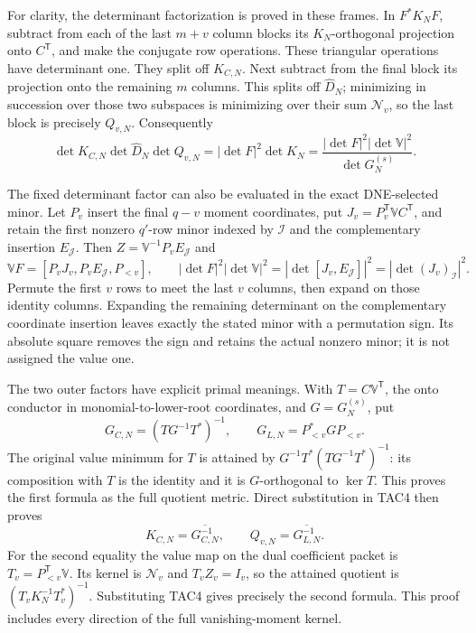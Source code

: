 \documentclass[11pt,a4paper]{article}
\begin{document}
For clarity, the determinant factorization is proved in these frames.
In $F^*K_NF$, subtract from each of the last $m+v$ column blocks
its $K_N$-orthogonal projection onto $C^{\mathsf T}$, and make the
conjugate row operations.  These triangular operations have determinant
one.  They split off $K_{C,N}$.  Next subtract from the final block
its projection onto the remaining $m$ columns.  This splits off
$\widehat D_N$; minimizing in succession over those two subspaces is
minimizing over their sum $\mathscr N_v$, so the last block is precisely
$Q_{v,N}$.  Consequently
\[
 \det K_{C,N}\det\widehat D_N\det Q_{v,N}
 =|\det F|^2\det K_N
 =\frac{|\det F|^2|\det\mathbb V|^2}{\det G_N^{(s)}}.
 \tag{TAC6}
\]

The fixed determinant factor can also be evaluated in the exact
DNE-selected minor. Let $P_v$ insert the final $q-v$ moment
coordinates, put $J_v=P_v^{\mathsf T}\mathbb V C^{\mathsf T}$,
and retain the first nonzero $q'$-row minor indexed by $\mathcal I$
and the complementary insertion $E_{\mathcal J}$. Then
$Z=\mathbb V^{-1}P_vE_{\mathcal J}$ and
\[
 \mathbb VF=[P_vJ_v,P_vE_{\mathcal J},P_{<v}],\qquad
 |\det F|^2|\det\mathbb V|^2
  =|\det[J_v,E_{\mathcal J}]|^2=|\det(J_v)_{\mathcal I}|^2.
 \tag{TAC6a}
\]
Permute the first $v$ rows to meet the last $v$ columns, then
expand on those identity columns. Expanding the remaining determinant
on the complementary coordinate insertion leaves exactly the stated
minor with a permutation sign. Its absolute square removes the sign
and retains the actual nonzero minor; it is not assigned the value one.

The two outer factors have explicit primal meanings. With
$T=C\mathbb V^{\mathsf T}$, the onto conductor in monomial-to-lower-root
coordinates, and $G=G_N^{(s)}$, put
\[
 G_{C,N}=(TG^{-1}T^*)^{-1},\qquad
 G_{L,N}=P_{<v}^*GP_{<v}.
\]
The original value minimum for $T$ is attained by
$G^{-1}T^*(TG^{-1}T^*)^{-1}$: its composition with $T$ is the
identity and it is $G$-orthogonal to $\ker T$. This proves the
first formula as the full quotient metric. Direct substitution in TAC4
then proves
\[
 K_{C,N}=\overline{G_{C,N}^{-1}},\qquad
 Q_{v,N}=\overline{G_{L,N}^{-1}}.
 \tag{TAC6b}
\]
For the second equality the value map on the dual coefficient packet is
$T_v=P_{<v}^{\mathsf T}\mathbb V$. Its kernel is $\mathscr N_v$
and $T_vZ_v=I_v$, so the attained quotient is
$(T_vK_N^{-1}T_v^*)^{-1}$. Substituting TAC4 gives precisely the
second formula. This proof includes every direction of the full
vanishing-moment kernel.
\end{document}
